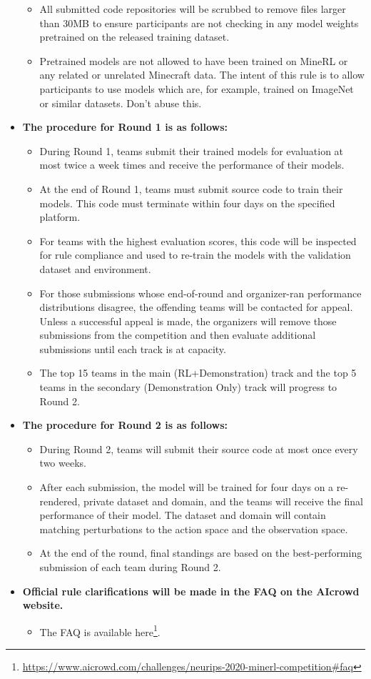 \begin{itemize}
\begin{itemize}
        \item All submitted code repositories will be scrubbed to remove files larger than 30MB to ensure participants are not checking in any model weights pretrained on the released training dataset.
        \item Pretrained models are not allowed to have been trained on MineRL or any related or unrelated Minecraft data. The intent of this rule is to allow participants to use models which are, for example, trained on ImageNet or similar datasets. Don't abuse this.
    \end{itemize}
    \item \textbf{The procedure for Round 1 is as follows:}
    \begin{itemize}
        \item During Round 1, teams submit their trained models for evaluation at most twice a week times and receive the performance of their models. 
        \item At the end of Round 1, teams must submit source code to train their models. This code must terminate within four days on the specified platform. 
        \item For teams with the highest evaluation scores, this code will be inspected for rule compliance and used to re-train the models with the validation dataset and environment. 
        \item For those submissions whose end-of-round and organizer-ran performance distributions disagree, the offending teams will be contacted for appeal. Unless a successful appeal is made, the organizers will remove those submissions from the competition and then evaluate additional submissions until each track is at capacity.
        \item The top 15 teams in the main (RL+Demonstration) track and the top 5 teams in the secondary (Demonstration Only) track will progress to Round 2.
    \end{itemize}   
    \item \textbf{The procedure for Round 2 is as follows:}
    \begin{itemize}
        \item During Round 2, teams will submit their source code at most once every two weeks.
        \item After each submission, the model will be trained for four days on a re-rendered, private dataset and domain, and the teams will receive the final performance of their model. The dataset and domain will contain matching perturbations to the action space and the observation space.
        \item At the end of the round, final standings are based on the best-performing submission of each team during Round 2.
    \end{itemize}
    \item \textbf{Official rule clarifications will be made in the FAQ on the AIcrowd website.}
    \begin{itemize}
    \item The FAQ is available here\footnote{\url{https://www.aicrowd.com/challenges/neurips-2020-minerl-competition\#faq}}.


\end{itemize}
\end{itemize}
